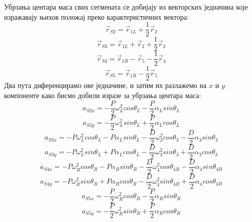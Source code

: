 \documentclass[12pt]{article}
\begin{document}
Убрзања центара маса свих сегмената се добијају из векторских једначина које изражавају њихов положај преко карактеристичних вектора:
\begin{equation}
    \vec{r}_{S2} = \vec{r}_{1L} + \dfrac{1}{2}\vec{r}_2
\end{equation}
\begin{equation}
    \vec{r}_{S3} = \vec{r}_{1L} + \vec{r}_2 + \dfrac{1}{2}\vec{r}_3
\end{equation}
\begin{equation}
    \vec{r}_{S4} = \vec{r}_{1R} - \vec{r}_5 - \dfrac{1}{2}\vec{r}_4
\end{equation}
\begin{equation}
    \vec{r}_{S5} = \vec{r}_{1R} - \dfrac{1}{2}\vec{r}_5
\end{equation}
Два пута диференцирамо ове једначине, и затим их разлажемо на  $x$ и $y$ компоненте како бисмо добили изразе за убрзања центара маса:
\begin{equation}
    a_{S2x} = -\dfrac{P}{2}\omega_L^2cos\theta_L - \dfrac{P}{2}\alpha_Lsin\theta_L
\end{equation}
\begin{equation}
    a_{S2y} = -\dfrac{P}{2}\omega_L^2sin\theta_L + \dfrac{P}{2}\alpha_Lcos\theta_L
\end{equation}
\begin{equation}
    a_{S3x} = -P\omega_L^2cos\theta_L - P\alpha_L sin\theta_L - \dfrac{D}{2}\omega_3^2cos\theta_3 - \dfrac{D}{2}\alpha_3sin\theta_3
\end{equation}
\begin{equation}
    a_{S3y} = -P\omega_L^2sin\theta_L + P\alpha_Lcos\theta_L - \dfrac{D}{2}\omega_3^2sin\theta_3 + \dfrac{D}{2}\alpha_3cos\theta_3
\end{equation}
\begin{equation}
    a_{S4x} = -P\omega_R^2cos\theta_R - P\alpha_R sin\theta_R - \dfrac{D}{2}\omega_4^2cos\theta_{4R} - \dfrac{D}{2}\alpha_4sin\theta_{4R}
\end{equation}
\begin{equation}
    a_{S4y} = -P\omega_R^2sin\theta_R + P\alpha_Rcos\theta_R - \dfrac{D}{2}\omega_4^2sin\theta_{4R} + \dfrac{D}{2}\alpha_4cos\theta_{4R}
\end{equation}
\begin{equation}
    a_{S5x} = -\dfrac{P}{2}\omega_R^2cos\theta_R - \dfrac{P}{2}\alpha_Rsin\theta_R
\end{equation}
\begin{equation}
    a_{S5y} = -\dfrac{P}{2}\omega_R^2sin\theta_R + \dfrac{P}{2}\alpha_Rcos\theta_R
\end{equation}
\end{document}
